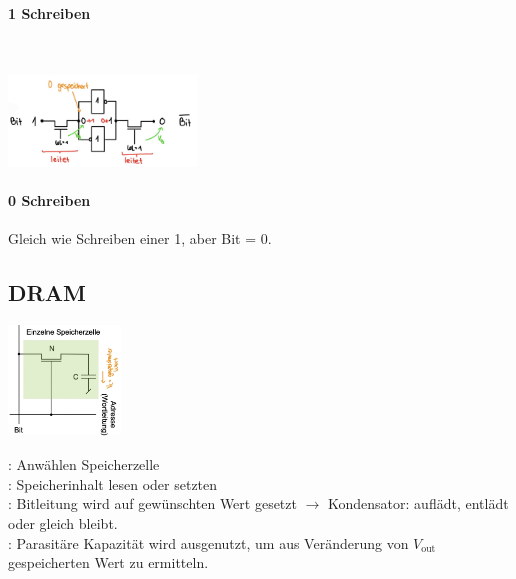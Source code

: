 \paragraph{1 Schreiben}\mbox{}\\
\begin{center}
    \includegraphics[width =50mm]{images/sram_write.JPG}
\end{center}
\paragraph{0 Schreiben} Gleich wie Schreiben einer 1, aber Bit = 0.

\subsection{DRAM}
\begin{center}
    \begin{minipage}{0.45\linewidth}
        \includegraphics[width = 30mm]{images/dram_store.JPG}
    \end{minipage}
    \hfill
    \begin{minipage}{0.5\linewidth}
        : Anwählen Speicherzelle\\
        : Speicherinhalt lesen oder setzten\\
        : Bitleitung wird auf gewünschten Wert gesetzt $\rightarrow$ Kondensator: auflädt, entlädt oder gleich bleibt.\\
        : Parasitäre Kapazität wird ausgenutzt, um aus Veränderung von $V_{\text{out}}$ gespeicherten Wert zu ermitteln.
    \end{minipage}
\end{center}

